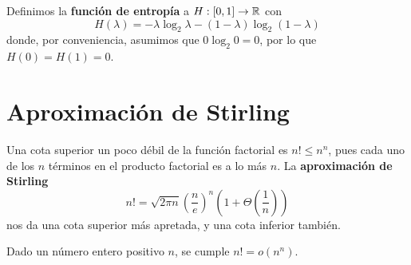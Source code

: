 





























Definimos la \textbf{funci\'on de entrop\'ia} a $H: [0, 1] \to \mathbb{R}$ con
\[
    H(\lambda)     = -\lambda \log_2 \lambda - (1 - \lambda) \log_2 (1 - \lambda)
\]
donde, por conveniencia, asumimos que $0 \log_2 0 = 0$, por lo que $H(0) = H(1) = 0$.





\section{Aproximaci\'on de Stirling}

Una cota superior un poco d\'ebil de la funci\'on factorial es $n! \leq n^n$, pues cada
uno de los $n$ t\'erminos en el producto factorial es a lo m\'as $n$.
La \textbf{aproximaci\'on de Stirling}
\[
    n! = \sqrt{2 \pi n} \left(\frac{n}{e}\right)^n \left(1 + \Theta\left(\frac{1}{n}\right)\right)
\]
nos da una cota superior m\'as apretada, y una cota inferior tambi\'en.

\begin{theorem}
    Dado un n\'umero entero positivo $n$, se cumple $n! = o(n^n)$.
\end{theorem}

